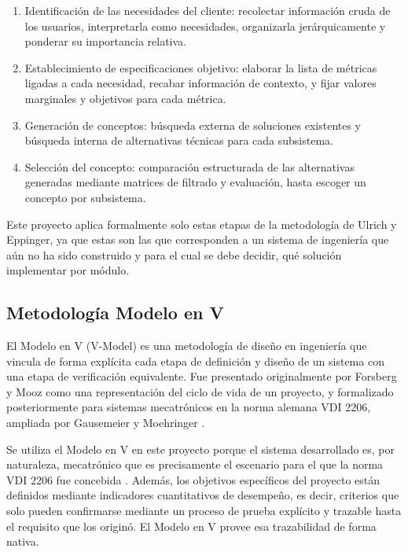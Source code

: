 \begin{enumerate}
  \item Identificación de las necesidades del cliente: recolectar información cruda de los 
  usuarios, interpretarla como necesidades, organizarla jerárquicamente y ponderar su importancia 
  relativa.
  \item Establecimiento de especificaciones objetivo: elaborar la lista de métricas ligadas a 
  cada necesidad, recabar información de contexto, y fijar valores marginales y objetivos para cada 
  métrica.
  \item Generación de conceptos: búsqueda externa de soluciones existentes y búsqueda interna 
  de alternativas técnicas para cada subsistema.
  \item Selección del concepto: comparación estructurada de las alternativas generadas mediante 
  matrices de filtrado y evaluación, hasta escoger un concepto por subsistema.
\end{enumerate}

Este proyecto aplica formalmente solo estas etapas de la metodología de Ulrich y Eppinger, ya 
que estas son las que corresponden a un sistema de ingeniería que aún no ha sido construido y para 
el cual se debe decidir, qué solución implementar por módulo. 

\subsection{Metodología Modelo en V}
\label{subsec:modelo_v}

El Modelo en V (V-Model) es una metodología de diseño en ingeniería que vincula de forma explícita 
cada etapa de definición y diseño de un sistema con una etapa de verificación equivalente. Fue 
presentado originalmente por Forsberg y Mooz \cite{Cite7} como una representación del ciclo de vida de un 
proyecto, y formalizado posteriormente para sistemas mecatrónicos en la norma alemana VDI 2206, ampliada 
por Gausemeier y Moehringer \cite{Cite8}. 

Se utiliza el Modelo en V en este proyecto porque el sistema desarrollado es, por naturaleza, 
mecatrónico que es precisamente el escenario para el que la norma VDI 2206 fue concebida \cite{Cite8}. 
Además, los objetivos específicos del proyecto están definidos mediante indicadores 
cuantitativos de desempeño, es decir, criterios que solo pueden confirmarse mediante un proceso de 
prueba explícito y trazable hasta el requisito que los originó. El Modelo en V provee esa 
trazabilidad de forma nativa.

